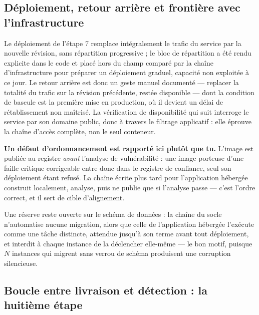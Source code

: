 \subsection{Déploiement, retour arrière et frontière avec l'infrastructure}

Le déploiement de l'étape 7 remplace intégralement le trafic du service par la nouvelle révision,
sans répartition progressive ; le bloc de répartition a été rendu explicite dans le code et placé
hors du champ comparé par la chaîne d'infrastructure pour préparer un déploiement graduel, capacité
non exploitée à ce jour. Le retour arrière est donc un geste manuel documenté --- replacer la
totalité du trafic sur la révision précédente, restée disponible --- dont la condition de bascule
est la première mise en production, où il devient un délai de rétablissement non maîtrisé. La
vérification de disponibilité qui suit interroge le service par son domaine public, donc à travers
le filtrage applicatif : elle éprouve la chaîne d'accès complète, non le seul conteneur.

\begin{alertbox}[boxsep=1pt, left=4pt, right=4pt, top=3pt, bottom=3pt]
\textbf{Un défaut d'ordonnancement est rapporté ici plutôt que tu.} L'image est publiée au
registre \emph{avant} l'analyse de vulnérabilité : une image porteuse d'une faille critique
corrigeable entre donc dans le registre de confiance, seul son déploiement étant refusé. La
chaîne écrite plus tard pour l'application hébergée construit localement, analyse, puis ne
publie que si l'analyse passe --- c'est l'ordre correct, et il sert de cible d'alignement.
\end{alertbox}

Une réserve reste ouverte sur le schéma de données : la chaîne du socle n'automatise aucune
migration, alors que celle de l'application hébergée l'exécute comme une tâche distincte, attendue
jusqu'à son terme avant tout déploiement, et interdit à chaque instance de la déclencher elle-même
--- le bon motif, puisque $N$ instances qui migrent sans verrou de schéma produisent une corruption
silencieuse.

\subsection{Boucle entre livraison et détection : la huitième étape}
\label{subsec:boucle-f6}


